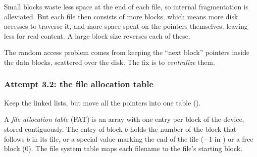 \begin{remark}
  Small blocks waste less space at the end of each file, so internal fragmentation is alleviated. But each file then consists of more blocks, which means more disk accesses to traverse it, and more space spent on the pointers themselves, leaving less for real content. A large block size reverses each of these.
\end{remark}

The random access problem comes from keeping the ``next block'' pointers inside the data blocks, scattered over the disk. The fix is to \emph{centralize} them.

\subsubsection{Attempt 3.2: the file allocation table}
Keep the linked lists, but move all the pointers into one table ().

\begin{definition}
  A \emph{file allocation table} (FAT) is an array with one entry per block of the device, stored contiguously. The entry of block $b$ holds the number of the block that follows $b$ in its file, or a special value marking the end of the file ($-1$ in ) or a free block ($0$). The file system table maps each filename to the file's starting block.
\end{definition}


